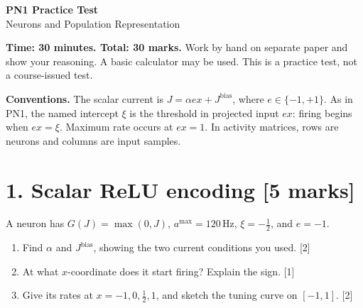 \documentclass[10pt,letterpaper]{article}
\begin{document}
\begin{center}
{\Large\bfseries PN1 Practice Test}\\[2pt]
Neurons and Population Representation
\end{center}
\noindent\textbf{Time: 30 minutes. Total: 30 marks.} Work by hand on separate paper and show your reasoning. A basic calculator may be used. This is a practice test, not a course-issued test.\par
\noindent\textbf{Conventions.} The scalar current is \(J=\alpha e x+J^{\mathrm{bias}}\), where \(e\in\{-1,+1\}\). As in PN1, the named intercept \(\xi\) is the threshold in projected input \(e x\): firing begins when \(e x=\xi\). Maximum rate occurs at \(e x=1\). In activity matrices, rows are neurons and columns are input samples.\par

\section*{1. Scalar ReLU encoding \hfill [5 marks]}
A neuron has \(G(J)=\max(0,J)\), \(a^{\max}=120\,\mathrm{Hz}\), \(\xi=-\tfrac12\), and \(e=-1\).
\begin{enumerate}[label=\textbf{(\alph*)}]
\item Find \(\alpha\) and \(J^{\mathrm{bias}}\), showing the two current conditions you used. [2]
\item At what \(x\)-coordinate does it start firing? Explain the sign. [1]
\item Give its rates at \(x=-1,0,\tfrac12,1\), and sketch the tuning curve on \([-1,1]\). [2]
\end{enumerate}
\end{document}
